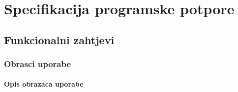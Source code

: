 
\chapter{Specifikacija programske potpore}

\section{Funkcionalni zahtjevi}

\subsection{Obrasci uporabe}


\subsubsection{Opis obrazaca uporabe}


